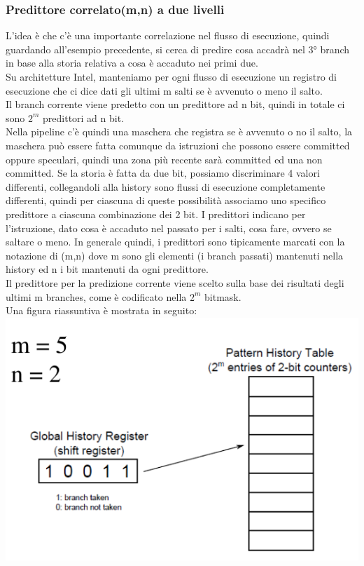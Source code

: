 \documentclass[12pt, oneside]{extbook}
\begin{document}
\subsubsection{Predittore correlato(m,n) a due livelli}
L'idea è che c'è una importante correlazione nel flusso di esecuzione, quindi guardando all'esempio precedente, si cerca di predire cosa accadrà nel 3° branch in base alla storia relativa a cosa è accaduto nei primi due.\\ Su architetture Intel, manteniamo per ogni flusso di esecuzione un registro di esecuzione che ci dice dati gli ultimi m salti se è avvenuto o meno il salto. \\ Il branch corrente viene predetto con un predittore ad n bit, quindi in totale ci sono $2^m$ predittori ad n bit.\\
Nella pipeline c'è quindi una maschera che registra se è avvenuto o no il salto, la maschera può essere fatta comunque da istruzioni che possono essere committed oppure speculari, quindi una zona più recente sarà committed ed una non committed. Se la storia è fatta da due bit, possiamo discriminare 4 valori differenti, collegandoli alla history sono flussi di esecuzione completamente differenti, quindi per ciascuna di queste possibilità associamo uno specifico predittore a ciascuna combinazione dei 2 bit. I predittori indicano per l'istruzione, dato cosa è accaduto nel passato per i salti, cosa fare, ovvero se saltare o meno. In generale quindi, i predittori sono tipicamente marcati con la notazione di (m,n) dove m sono gli elementi (i branch passati) mantenuti nella history ed n i bit mantenuti da ogni predittore.\\ Il predittore per la predizione corrente viene scelto sulla base dei risultati degli ultimi m branches, come è codificato nella $2^m$ bitmask.\\ Una figura riassuntiva è mostrata in seguito:\\
\includegraphics[scale=0.4]{immagini/corr_pred}
\end{document}
